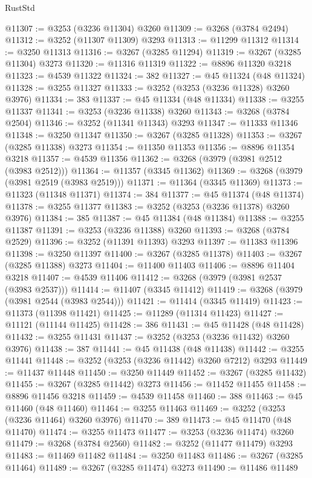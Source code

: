 \begin{lexlean}{RustStd}
\begin{coremodule}
@11307 := @3253 (@3236 @11304) @3260
@11309 := @3268 (@3784 @2494)
@11312 := @3252 (@11307 @11309) @3293
@11313 := @11299 @11312
@11314 := @3250 @11313
@11316 := @3267 (@3285 @11294)
@11319 := @3267 (@3285 @11304) @3273
@11320 := @11316 @11319
@11322 := @8896 @11320 @3218
@11323 := @4539 @11322
@11324 := 382
@11327 := @45 @11324 (@48 @11324)
@11328 := @3255 @11327
@11333 := @3252 (@3253 (@3236 @11328) @3260 @3976)
@11334 := 383
@11337 := @45 @11334 (@48 @11334)
@11338 := @3255 @11337
@11341 := @3253 (@3236 @11338) @3260
@11343 := @3268 (@3784 @2504)
@11346 := @3252 (@11341 @11343) @3293
@11347 := @11333 @11346
@11348 := @3250 @11347
@11350 := @3267 (@3285 @11328)
@11353 := @3267 (@3285 @11338) @3273
@11354 := @11350 @11353
@11356 := @8896 @11354 @3218
@11357 := @4539 @11356
@11362 := @3268 (@3979 (@3981 @2512 (@3983 @2512)))
@11364 := @11357 (@3345 @11362)
@11369 := @3268 (@3979 (@3981 @2519 (@3983 @2519)))
@11371 := @11364 (@3345 @11369)
@11373 := @11323 (@11348 @11371)
@11374 := 384
@11377 := @45 @11374 (@48 @11374)
@11378 := @3255 @11377
@11383 := @3252 (@3253 (@3236 @11378) @3260 @3976)
@11384 := 385
@11387 := @45 @11384 (@48 @11384)
@11388 := @3255 @11387
@11391 := @3253 (@3236 @11388) @3260
@11393 := @3268 (@3784 @2529)
@11396 := @3252 (@11391 @11393) @3293
@11397 := @11383 @11396
@11398 := @3250 @11397
@11400 := @3267 (@3285 @11378)
@11403 := @3267 (@3285 @11388) @3273
@11404 := @11400 @11403
@11406 := @8896 @11404 @3218
@11407 := @4539 @11406
@11412 := @3268 (@3979 (@3981 @2537 (@3983 @2537)))
@11414 := @11407 (@3345 @11412)
@11419 := @3268 (@3979 (@3981 @2544 (@3983 @2544)))
@11421 := @11414 (@3345 @11419)
@11423 := @11373 (@11398 @11421)
@11425 := @11289 (@11314 @11423)
@11427 := @11121 (@11144 @11425)
@11428 := 386
@11431 := @45 @11428 (@48 @11428)
@11432 := @3255 @11431
@11437 := @3252 (@3253 (@3236 @11432) @3260 @3976)
@11438 := 387
@11441 := @45 @11438 (@48 @11438)
@11442 := @3255 @11441
@11448 := @3252 (@3253 (@3236 @11442) @3260 @7212) @3293
@11449 := @11437 @11448
@11450 := @3250 @11449
@11452 := @3267 (@3285 @11432)
@11455 := @3267 (@3285 @11442) @3273
@11456 := @11452 @11455
@11458 := @8896 @11456 @3218
@11459 := @4539 @11458
@11460 := 388
@11463 := @45 @11460 (@48 @11460)
@11464 := @3255 @11463
@11469 := @3252 (@3253 (@3236 @11464) @3260 @3976)
@11470 := 389
@11473 := @45 @11470 (@48 @11470)
@11474 := @3255 @11473
@11477 := @3253 (@3236 @11474) @3260
@11479 := @3268 (@3784 @2560)
@11482 := @3252 (@11477 @11479) @3293
@11483 := @11469 @11482
@11484 := @3250 @11483
@11486 := @3267 (@3285 @11464)
@11489 := @3267 (@3285 @11474) @3273
@11490 := @11486 @11489

\end{coremodule}
\end{lexlean}
